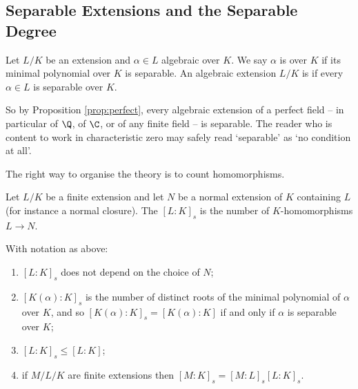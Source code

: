 \subsection{Separable Extensions and the Separable Degree}

\begin{definition}
	Let $L/K$ be an extension and $\alpha \in L$ algebraic over $K$. We say $\alpha$ is  over $K$ if its minimal polynomial over $K$ is separable. An algebraic extension $L/K$ is  if every $\alpha \in L$ is separable over $K$.
\end{definition}

So by Proposition \ref{prop:perfect}, every algebraic extension of a perfect field -- in particular of $\Q$, of $\C$, or of any finite field -- is separable. The reader who is content to work in characteristic zero may safely read `separable' as `no condition at all'.

The right way to organise the theory is to count homomorphisms.

\begin{definition}
	Let $L/K$ be a finite extension and let $N$ be a normal extension of $K$ containing $L$ (for instance a normal closure). The  $[L:K]_s$ is the number of $K$-homomorphisms $L \to N$.
\end{definition}

\begin{proposition}\label{prop:sepdeg}
	With notation as above:
	\begin{enumerate}[label=(\roman*)]
		\item $[L:K]_s$ does not depend on the choice of $N$;
		\item $[K(\alpha):K]_s$ is the number of distinct roots of the minimal polynomial of $\alpha$ over $K$, and so $[K(\alpha):K]_s = [K(\alpha):K]$ if and only if $\alpha$ is separable over $K$;
		\item $[L:K]_s \leq [L:K]$;
		\item if $M/L/K$ are finite extensions then $[M:K]_s = [M:L]_s[L:K]_s$.
	\end{enumerate}
\end{proposition}


